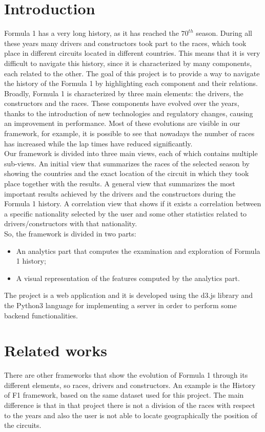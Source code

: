 \documentclass[11pt,twocolumn,letterpaper]{article}
\begin{document}
\section{Introduction}
Formula 1 has a very long history, as it has reached the $70^{th}$ season. During all these years many drivers and constructors took part to the races, which took place in different circuits located in different countries. This means that it is very difficult to navigate this history, since it is characterized by many components, each related to the other. The goal of this project is to provide a way to navigate the history of the Formula 1 by highlighting each component and their relations. Broadly, Formula 1 is characterized by three main elements: the drivers, the constructors and the races. These components have evolved over the years, thanks to the introduction of new technologies and regulatory changes, causing an improvement in performance. Most of these evolutions are visible in our framework, for example, it is possible to see that nowadays the number of races has increased while the lap times have reduced significantly.\\
Our framework is divided into three main views, each of which contains multiple sub-views. An initial view that summarizes the races of the selected season by showing the countries and the exact location of the circuit in which they took place together with the results. A general view that summarizes the most important results achieved by the drivers and the constructors during the Formula 1 history. A correlation view that shows if it exists a correlation between a specific nationality selected by the user and some other statistics related to drivers/constructors with that nationality. \\
So, the framework is divided in two parts:
\begin{itemize}
	\item An analytics part that computes the examination and exploration of Formula 1 history;
	\item A visual representation of the features computed by the analytics part.
\end{itemize}
The project is a web application and it is developed using the d3.js \cite{D3} library and the Python3 language for implementing a server in order to perform some backend functionalities.

\section{Related works}
There are other frameworks that show the evolution of Formula 1 through its different elements, so races, drivers and constructors. An example is the History of F1 \cite{HistoryOfF1} framework, based on the same dataset used for this project. The main difference is that in that project there is not a division of the races with respect to the years and also the user is not able to locate geographically the position of the circuits. 
\end{document}

